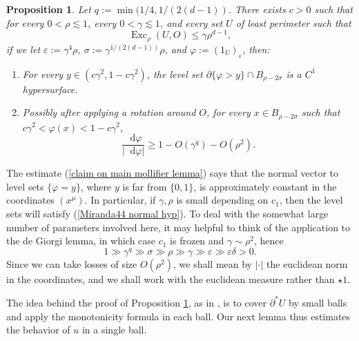 \documentclass[reqno,11pt]{amsart}
\DeclareMathOperator{\Exc}{Exc}
\newcommand*\dif{\mathop{}\!\mathrm{d}}
\newtheorem{proposition}[theorem]{Proposition}
\theoremstyle{definition}
\numberwithin{equation}{section}
\begin{document}
\begin{proposition}\label{main mollifier lemma}
Let $q := \min(1/4, 1/(2(d - 1))$.
There exists $c > 0$ such that for every $0 < \rho \lesssim 1$, every $0 < \gamma \lesssim 1$, and every set $U$ of least perimeter such that
\begin{equation}\label{hypothesis on main mollifier lemma}
\Exc_\rho(U, O) \leq \gamma \rho^{d - 1},
\end{equation}
if we let $\varepsilon := \gamma^4\rho$, $\sigma := \gamma^{1/(2(d - 1))}\rho$, and $\varphi := (1_U)_\varepsilon$, then:
\begin{enumerate}
\item For every $y \in (c\gamma^2, 1 - c\gamma^2)$, the level set $\partial \{\varphi > y\} \cap B_{\rho - 2\sigma}$ is a $C^1$ hypersurface.
\item Possibly after applying a rotation around $O$, for every $x \in B_{\rho - 2\sigma}$ such that $c\gamma^2 < \varphi(x) < 1 - c\gamma^2$,
\begin{equation}\label{claim on main mollifier lemma}
\frac{\dif \varphi}{|\dif \varphi|} \geq 1 - O(\gamma^q) - O(\rho^2).
\end{equation}
\end{enumerate}
\end{proposition}

The estimate (\ref{claim on main mollifier lemma}) says that the normal vector to level sets $\{\varphi = y\}$, where $y$ is far from $\{0, 1\}$, is approximately constant in the coordinates $(x^\mu)$.
In particular, if $\gamma, \rho$ is small depending on $c_1$, then the level sets will satisfy (\ref{Miranda44 normal hyp}).
To deal with the somewhat large number of parameters involved here, it may helpful to think of the application to the de Giorgi lemma, in which case $c_1$ is frozen and $\gamma \sim \rho^2$, hence
$$1 \gg \gamma^q \gg \sigma \gg \rho \gg \gamma \gg \varepsilon \gg \varepsilon \delta > 0.$$
Since we can take losses of size $O(\rho^2)$, we shall mean by $|\cdot|$ the euclidean norm in the coordinates, and we shall work with the euclidean measure rather than $\star 1$.

The idea behind the proof of Proposition \ref{main mollifier lemma}, as in \cite{Giusti77}, is to cover $\partial^* U$ by small balls and apply the monotonicity formula in each ball.
Our next lemma thus estimates the behavior of $u$ in a single ball.
\end{document}
